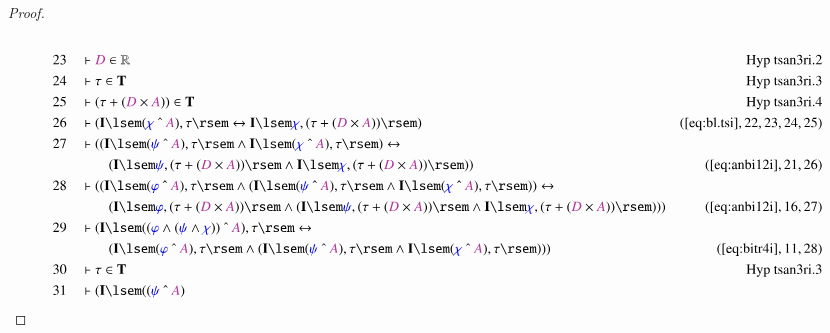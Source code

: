 \begin{proof}
\begin{align}
  \\ 23 &&  & \vdash \mc{D} \in
      \mathbb{R}&\text{Hyp~tsan3ri.2}\notag%
  \\ 24 &&  & \vdash \tau \in
      \mathbf{T}&\text{Hyp~tsan3ri.3}\notag%
  \\ 25 &&  & \vdash ( \tau + ( \mc{D} \times \mc{A} ) ) \in
      \mathbf{T}&\text{Hyp~tsan3ri.4}\notag%
  \\ 26 &&  & \vdash ( \mathbf{I} \lsem ( \mw{\chi} ~\string^~ \mc{A} ) , \tau
      \rsem \leftrightarrow \mathbf{I} \lsem \mw{\chi} , (
      \tau + ( \mc{D} \times \mc{A} ) ) \rsem
      )&(\mbox{\ref{eq:bl.tsi}},22,23,24,25)\notag
  \\ 27 &&  & \vdash ( ( \mathbf{I} \lsem ( \mw{\psi} ~\string^~ \mc{A} ) ,
      \tau \rsem \wedge \mathbf{I} \lsem ( \mw{\chi}
      ~\string^~ \mc{A} ) , \tau \rsem ) \leftrightarrow  \notag \\ & & & \qquad
     (
      \mathbf{I} \lsem \mw{\psi} , ( \tau + ( \mc{D} \times
      \mc{A} ) ) \rsem \wedge \mathbf{I} \lsem \mw{\chi} ,
      ( \tau + ( \mc{D} \times \mc{A} ) ) \rsem )
      )&(\mbox{\ref{eq:anbi12i}},21,26)\notag
  \\ 28 &&  & \vdash ( ( \mathbf{I} \lsem ( \mw{\varphi} ~\string^~ \mc{A} ) ,
      \tau \rsem \wedge ( \mathbf{I} \lsem ( \mw{\psi}
      ~\string^~ \mc{A} ) , \tau \rsem \wedge \mathbf{I}
      \lsem ( \mw{\chi} ~\string^~ \mc{A} ) , \tau \rsem )
      ) \leftrightarrow  \notag \\ & & & \qquad
     ( \mathbf{I} \lsem \mw{\varphi} , (
      \tau + ( \mc{D} \times \mc{A} ) ) \rsem \wedge (
      \mathbf{I} \lsem \mw{\psi} , ( \tau + ( \mc{D} \times
      \mc{A} ) ) \rsem \wedge \mathbf{I} \lsem \mw{\chi} ,
      ( \tau + ( \mc{D} \times \mc{A} ) ) \rsem ) )
      )&(\mbox{\ref{eq:anbi12i}},16,27)\notag
  \\ 29 &&  & \vdash ( \mathbf{I} \lsem ( ( \mw{\varphi} \wedge ( \mw{\psi}
      \wedge \mw{\chi} ) ) ~\string^~ \mc{A} ) , \tau \rsem
      \leftrightarrow  \notag \\ & & & \qquad
     ( \mathbf{I} \lsem ( \mw{\varphi}
      ~\string^~ \mc{A} ) , \tau \rsem \wedge ( \mathbf{I}
      \lsem ( \mw{\psi} ~\string^~ \mc{A} ) , \tau \rsem
      \wedge \mathbf{I} \lsem ( \mw{\chi} ~\string^~ \mc{A}
      ) , \tau \rsem ) )
      )&(\mbox{\ref{eq:bitr4i}},11,28)\notag
  \\ 30 &&  & \vdash \tau \in
      \mathbf{T}&\text{Hyp~tsan3ri.3}\notag%
  \\ 31 &&  & \vdash ( \mathbf{I} \lsem ( ( \mw{\psi} ~\string^~ \mc{A} )

\end{align}
\end{proof}
